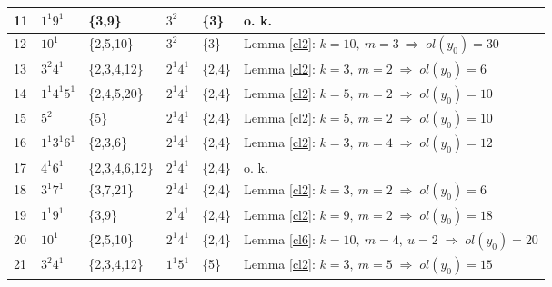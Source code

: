 {{\begin{flushleft}
{\begin{tabular}{||l|l|l|l|l|l||}
    11     & $1^{1}9^{1}$          & {\scriptsize \{3,9\}}    & $3^{2}$           & {\scriptsize \{3\}}                        &  {\scriptsize o. k.}    \\ \hline 
    12     & $10^{1}$              & {\scriptsize \{2,5,10\}} & $3^{2}$           & {\scriptsize \{3\}}     & {\scriptsize Lemma \ref{cl2}: $k=10, \ m=3 \; {\Rightarrow} \; ol(y_{0})=30$} \\ \hline 
    13     & $3^{2}4^{1}$          &{\scriptsize \{2,3,4,12\}}& $2^{1}4^{1}$      & {\scriptsize \{2,4\}}     & {\scriptsize Lemma \ref{cl2}: $k=3, \ m=2 \; {\Rightarrow} \; ol(y_{0})=6$} \\ \hline 
    14     & $1^{1}4^{1}5^{1}$     &{\scriptsize \{2,4,5,20\}}&$2^{1}4^{1}$       & {\scriptsize \{2,4\}}     & {\scriptsize Lemma \ref{cl2}: $k=5, \ m=2 \; {\Rightarrow} \; ol(y_{0})=10$} \\ \hline 
    15     & $5^{2}$               & {\scriptsize \{5\}}      & $2^{1}4^{1}$      & {\scriptsize \{2,4\}}     & {\scriptsize Lemma \ref{cl2}: $k=5, \ m=2 \; {\Rightarrow} \; ol(y_{0})=10$} \\ \hline 
    16     & $1^{1}3^{1}6^{1}$     & {\scriptsize \{2,3,6\}}  & $2^{1}4^{1}$      & {\scriptsize \{2,4\}}     & {\scriptsize Lemma \ref{cl2}: $k=3, \ m=4 \; {\Rightarrow} \; ol(y_{0})=12$} \\ \hline 
    17     & $4^{1}6^{1}$          & {\scriptsize \{2,3,4,6,12\}}& $2^{1}4^{1}$      &{\scriptsize \{2,4\}} &  {\scriptsize o. k.}   \\ \hline 
    18     & $3^{1}7^{1}$          & {\scriptsize \{3,7,21\}} & $2^{1}4^{1}$      & {\scriptsize \{2,4\}}     & {\scriptsize Lemma \ref{cl2}: $k=3, \ m=2 \; {\Rightarrow} \; ol(y_{0})=6$} \\ \hline 
    19     & $1^{1}9^{1}$          & {\scriptsize \{3,9\}}    & $2^{1}4^{1}$      & {\scriptsize \{2,4\}}     & {\scriptsize Lemma \ref{cl2}: $k=9, \ m=2 \; {\Rightarrow} \; ol(y_{0})=18$} \\ \hline 
    20     & $10^{1}$             &{\scriptsize \{2,5,10\}}& $2^{1}4^{1}$      &  {\scriptsize \{2,4\}}  & {\scriptsize Lemma \ref{cl6}: $k=10, \ m=4, \ u=2 \; {\Rightarrow} \; ol(y_{0})=20$} \\ \hline 
   21     &$ 3^{2}4^{1} $         & {\scriptsize \{2,3,4,12\}}& $1^{1}5^{1}$      & {\scriptsize \{5\}}     & {\scriptsize Lemma \ref{cl2}: $k=3, \ m=5 \; {\Rightarrow} \; ol(y_{0})=15$} \\ \hline 
\end{tabular}
}
\end{flushleft}

}}
